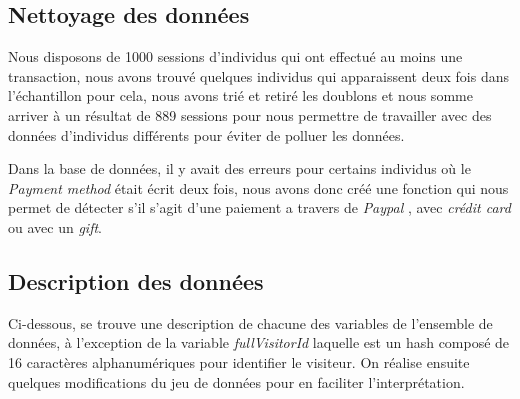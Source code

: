 
\subsection{Nettoyage des données}
Nous disposons de 1000 sessions d'individus qui ont effectué au moins une transaction, nous avons  trouvé quelques individus qui apparaissent deux fois dans l'échantillon pour cela, nous avons trié et  retiré les doublons et nous somme arriver à un résultat de 889 sessions pour nous permettre de  travailler avec des données d'individus différents pour éviter de polluer les données. 

Dans la base de données, il y avait des erreurs pour certains individus où le \textit{Payment method}  était écrit deux fois, nous avons donc créé une fonction qui nous permet de détecter s'il s'agit d'une paiement a travers de \textit{Paypal} , avec \textit{crédit card}   ou avec un \textit{gift}.

\subsection{Description des données}
Ci-dessous, se trouve une description de chacune des variables de l'ensemble de données, à  l'exception de la variable \textit{fullVisitorId} laquelle est un hash composé de 16 caractères  alphanumériques pour identifier le visiteur. On réalise ensuite quelques modifications du jeu de  données pour en faciliter l'interprétation. 



